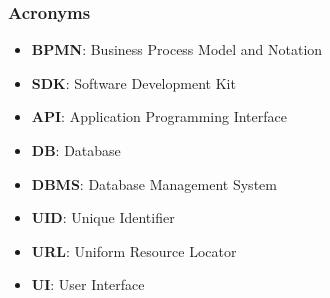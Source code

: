 \subsubsection{Acronyms}
\begin{itemize}
\item \textbf{BPMN}: Business Process Model and Notation
\item \textbf{SDK}: Software Development Kit
\item \textbf{API}: Application Programming Interface
\item \textbf{DB}: Database
\item \textbf{DBMS}: Database Management System
\item \textbf{UID}: Unique Identifier
\item \textbf{URL}: Uniform Resource Locator
\item \textbf{UI}: User Interface
\end{itemize}